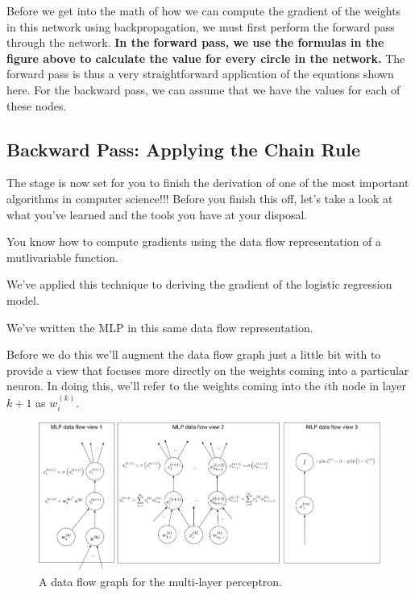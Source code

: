 \documentclass[assignment06_Solutions]{subfiles}
\begin{document}
Before we get into the math of how we can compute the gradient of the weights in this network using backpropagation, we must first perform the forward pass through the network.  \textbf{In the forward pass, we use the formulas in the figure above to calculate the value for every circle in the network.}  The forward pass is thus a very straightforward application of the equations shown here.  For the backward pass, we can assume that we have the values for each of these nodes.

\subsection{Backward Pass: Applying the Chain Rule}

The stage is now set for you to finish the derivation of one of the most important algorithms in computer science!!!  Before you finish this off, let's take a look at what you've learned and the tools you have at your disposal.
\be
\item You know how to compute gradients using the data flow representation of a mutlivariable function.
\item We've applied this technique to deriving the gradient of the logistic regression model.
\item We've written the MLP in this same data flow representation.
\ee

Before we do this we'll augment the data flow graph just a little bit with to provide a view that focuses more directly on the weights coming into a particular neuron.  In doing this, we'll refer to the weights coming into the $i$th node in layer $k+1$ as $w^{(k)}_i$.

\begin{figure}
\begin{center}
\includegraphics[width=\linewidth]{figures/mlpfull}
\end{center}
\caption{A data flow graph for the multi-layer perceptron.\label{fig:mlpgeneral}}
\end{figure}
\end{document}
